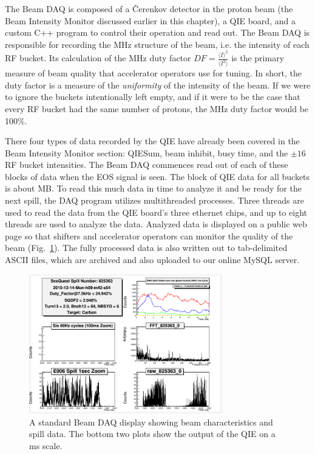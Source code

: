 The Beam DAQ is composed of a \v{C}erenkov detector in the proton beam (the Beam Intensity Monitor discussed earlier in this chapter), a QIE board, and a custom C++ program to control their operation and read out. The Beam DAQ is responsible for recording the \unit[53]{MHz} structure of the beam, i.e. the intensity of each RF bucket. Its calculation of the \unit[53]{MHz} duty factor $DF=\frac{\langle I\rangle^{2}}{\langle I^{2}\rangle}$ is the primary measure of beam quality that accelerator operators use for tuning. In short, the duty factor is a measure of the \emph{uniformity} of the intensity of the beam. If we were to ignore the buckets intentionally left empty, and if it were to be the case that every RF bucket had the same number of protons, the \unit[53]{MHz} duty factor would be 100\%.

There four types of data recorded by the QIE have already been covered in the Beam Intensity Monitor section: QIESum, beam inhibit, busy time, and the $\pm16$ RF bucket intensities. The Beam DAQ commences read out of each of these blocks of data when the EOS signal is seen. The block of QIE data for all buckets is about \unit[300]{MB}. To read this much data in time to analyze it and be ready for the next spill, the DAQ program utilizes multithreaded processes. Three threads are used to read the data from the QIE board's three ethernet chips, and up to eight threads are used to analyze the data. Analyzed data is displayed on a public web page so that shifters and accelerator operators can monitor the quality of the beam (Fig.~\ref{fig:beamdaq}). The fully processed data is also written out to tab-delimited ASCII files, which are archived and also uploaded to our online MySQL server.

\begin{figure}
\centering
\includegraphics[width=0.75\textwidth]{figures/apparatus/E906FFT-scalerDAQ.png}
\caption{A standard Beam DAQ display showing beam characteristics and spill data. The bottom two plots show the output of the QIE on a \unit[]{ms} scale.}
\label{fig:beamdaq}
\end{figure}

